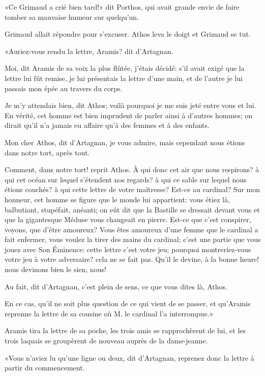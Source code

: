 «Ce Grimaud a crié bien tard!» dit Porthos, qui avait grande envie de faire tomber sa mauvaise humeur sur quelqu'un. 

Grimaud allait répondre pour s'excuser. Athos leva le doigt et Grimaud se tut. 

«Auriez-vous rendu la lettre, Aramis? dit d'Artagnan. 

\speak  Moi, dit Aramis de sa voix la plus flûtée, j'étais décidé: s'il avait exigé que la lettre lui fût remise, je lui présentais la lettre d'une main, et de l'autre je lui passais mon épée au travers du corps. 

\speak  Je m'y attendais bien, dit Athos; voilà pourquoi je me suis jeté entre vous et lui. En vérité, cet homme est bien imprudent de parler ainsi à d'autres hommes; on dirait qu'il n'a jamais eu affaire qu'à des femmes et à des enfants. 

\speak  Mon cher Athos, dit d'Artagnan, je vous admire, mais cependant nous étions dans notre tort, après tout. 

\speak  Comment, dans notre tort! reprit Athos. À qui donc cet air que nous respirons? à qui cet océan sur lequel s'étendent nos regards? à qui ce sable sur lequel nous étions couchés? à qui cette lettre de votre maîtresse? Est-ce au cardinal? Sur mon honneur, cet homme se figure que le monde lui appartient: vous étiez là, balbutiant, stupéfait, anéanti; on eût dit que la Bastille se dressait devant vous et que la gigantesque Méduse vous changeait en pierre. Est-ce que c'est conspirer, voyons, que d'être amoureux? Vous êtes amoureux d'une femme que le cardinal a fait enfermer, vous voulez la tirer des mains du cardinal; c'est une partie que vous jouez avec Son Éminence: cette lettre c'est votre jeu; pourquoi montreriez-vous votre jeu à votre adversaire? cela ne se fait pas. Qu'il le devine, à la bonne heure! nous devinons bien le sien, nous! 

\speak  Au fait, dit d'Artagnan, c'est plein de sens, ce que vous dites là, Athos. 

\speak  En ce cas, qu'il ne soit plus question de ce qui vient de se passer, et qu'Aramis reprenne la lettre de sa cousine où M. le cardinal l'a interrompue.» 

Aramis tira la lettre de sa poche, les trois amis se rapprochèrent de lui, et les trois laquais se groupèrent de nouveau auprès de la dame-jeanne. 

«Vous n'aviez lu qu'une ligne ou deux, dit d'Artagnan, reprenez donc la lettre à partir du commencement. 

